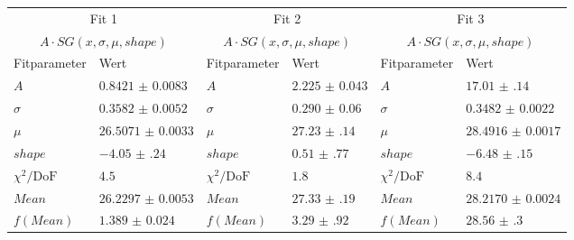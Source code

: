 \begin{table}[H]
\centering
\begin{tabular}{@{} l l l l l l @{}}
\toprule
\multicolumn{2}{c}{Fit 1} & \multicolumn{2}{c}{Fit 2} & \multicolumn{2}{c}{Fit 3} \\
\multicolumn{2}{c}{$A \cdot SG(x, \sigma, \mu, shape)$} & \multicolumn{2}{c}{$A \cdot SG(x, \sigma, \mu, shape)$} & \multicolumn{2}{c}{$A \cdot SG(x, \sigma, \mu, shape)$} \\
\cmidrule(r){1-2} \cmidrule(lr){3-4} \cmidrule(l){5-6} 
Fitparameter & Wert & Fitparameter & Wert & Fitparameter & Wert \\
\midrule
$A$ & $\num{0.8421(83)}$ & $A$ & $\num{2.225(43)}$ & $A$ & $\num{17.01(14)}$  \\
$\sigma$ & $\num{0.3582(52)}$ & $\sigma$ & $\num{0.290(60)}$ & $\sigma$ & $\num{0.3482(22)}$  \\
$\mu$ & $\num{26.5071(33)}$ & $\mu$ & $\num{27.23(14)}$ & $\mu$ & $\num{28.4916(17)}$  \\
$shape$ & $\num{-4.05(24)}$ & $shape$ & $\num{0.51(77)}$ & $shape$ & $\num{-6.48(15)}$  \\
$\chi^2 / \mathrm{DoF}$ & $\num{4.5}$ & $\chi^2 / \mathrm{DoF}$ & $\num{1.8}$ & $\chi^2 / \mathrm{DoF}$ & $\num{8.4}$  \\
$Mean$ & $\num{26.2297(53)}$ & $Mean$ & $\num{27.33(19)}$ & $Mean$ & $\num{28.2170(24)}$  \\
$f(Mean)$ & $\num{1.389(24)}$ & $f(Mean)$ & $\num{3.29(92)}$ & $f(Mean)$ & $\num{28.56(30)}$  \\
\bottomrule
\end{tabular}
\end{table}
